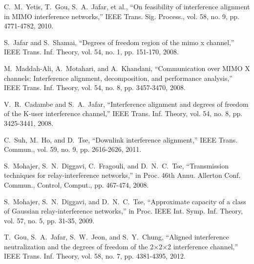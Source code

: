 \documentclass[10pt, conference, letterpaper]{IEEEtran}
\begin{document}
%
%
%
\begin{thebibliography}{1}

C.~M.~Yetis, T.~Gou, S.~A.~Jafar, et al., ``On feasibility of interference alignment in MIMO interference networks,''
IEEE Trans. Sig. Process., vol. 58, no. 9, pp. 4771-4782, 2010.

S.~Jafar and S.~Shamai, ``Degrees of freedom region of the mimo x channel,'' IEEE Trans. Inf. Theory, vol. 54, no. 1, pp. 151-170, 2008.

M.~Maddah-Ali, A.~Motahari, and A.~Khandani, ``Communication over MIMO X channels: Interference alignment, decomposition, and performance analysis,''
IEEE Trans. Inf. Theory, vol. 54, no. 8, pp. 3457-3470, 2008.

V.~R.~Cadambe and S.~A.~Jafar, ``Interference alignment and degrees of freedom of the K-user interference channel,''
IEEE Trans. Inf. Theory, vol. 54, no. 8, pp. 3425-3441, 2008.

C.~Suh, M.~Ho, and D.~Tse, ``Downlink interference alignment,'' IEEE Trans. Commun., vol. 59, no. 9, pp. 2616-2626, 2011.

S.~Mohajer, S.~N.~Diggavi, C.~Fragouli, and D.~N.~C.~Tse, ``Transmission techniques for relay-interference networks,''
in Proc. 46th Annu. Allerton Conf. Commun., Control, Comput., pp. 467-474, 2008.

S.~Mohajer, S.~N.~Diggavi, and D.~N.~C.~Tse, ``Approximate capacity of a class of Gaussian relay-interference networks,''
in Proc. IEEE Int. Symp. Inf. Theory, vol. 57, no. 5, pp. 31-35, 2009.

T.~Gou, S.~A.~Jafar, S.~W.~Jeon, and S.~Y.~Chung, ``Aligned interference neutralization and the degrees of freedom of the 2$\times$2$\times$2 interference channel,'' IEEE Trans. Inf. Theory, vol. 58, no. 7, pp. 4381-4395, 2012.


\end{thebibliography}
\end{document}
